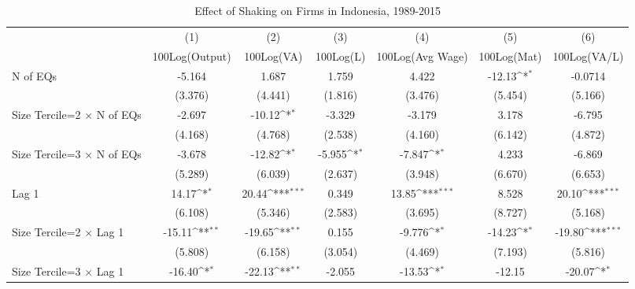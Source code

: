 \begin{table}[htbp]\centering
\def\sym#1{\ifmmode^{#1}\else\(^{#1}\)\fi}
\caption{Effect of Shaking on Firms in Indonesia, 1989-2015}
\begin{tabular}{l*{6}{c}}
\toprule
                &\multicolumn{1}{c}{(1)}&\multicolumn{1}{c}{(2)}&\multicolumn{1}{c}{(3)}&\multicolumn{1}{c}{(4)}&\multicolumn{1}{c}{(5)}&\multicolumn{1}{c}{(6)}\\
                &\multicolumn{1}{c}{100Log(Output)}&\multicolumn{1}{c}{100Log(VA)}&\multicolumn{1}{c}{100Log(L)}&\multicolumn{1}{c}{100Log(Avg Wage)}&\multicolumn{1}{c}{100Log(Mat)}&\multicolumn{1}{c}{100Log(VA/L)}\\
\midrule
N of EQs        &   -5.164         &    1.687         &    1.759         &    4.422         &   -12.13\sym{*}  &  -0.0714         \\
                &  (3.376)         &  (4.441)         &  (1.816)         &  (3.476)         &  (5.454)         &  (5.166)         \\
\addlinespace
Size Tercile=2 $\times$ N of EQs&   -2.697         &   -10.12\sym{*}  &   -3.329         &   -3.179         &    3.178         &   -6.795         \\
                &  (4.168)         &  (4.768)         &  (2.538)         &  (4.160)         &  (6.142)         &  (4.872)         \\
\addlinespace
Size Tercile=3 $\times$ N of EQs&   -3.678         &   -12.82\sym{*}  &   -5.955\sym{*}  &   -7.847\sym{*}  &    4.233         &   -6.869         \\
                &  (5.289)         &  (6.039)         &  (2.637)         &  (3.948)         &  (6.670)         &  (6.653)         \\
\addlinespace
Lag 1           &    14.17\sym{*}  &    20.44\sym{***}&    0.349         &    13.85\sym{***}&    8.528         &    20.10\sym{***}\\
                &  (6.108)         &  (5.346)         &  (2.583)         &  (3.695)         &  (8.727)         &  (5.168)         \\
\addlinespace
Size Tercile=2 $\times$ Lag 1&   -15.11\sym{**} &   -19.65\sym{**} &    0.155         &   -9.776\sym{*}  &   -14.23\sym{*}  &   -19.80\sym{***}\\
                &  (5.808)         &  (6.158)         &  (3.054)         &  (4.469)         &  (7.193)         &  (5.816)         \\
\addlinespace
Size Tercile=3 $\times$ Lag 1&   -16.40\sym{*}  &   -22.13\sym{**} &   -2.055         &   -13.53\sym{*}  &   -12.15         &   -20.07\sym{*}  \\

\end{tabular}
\end{table}
